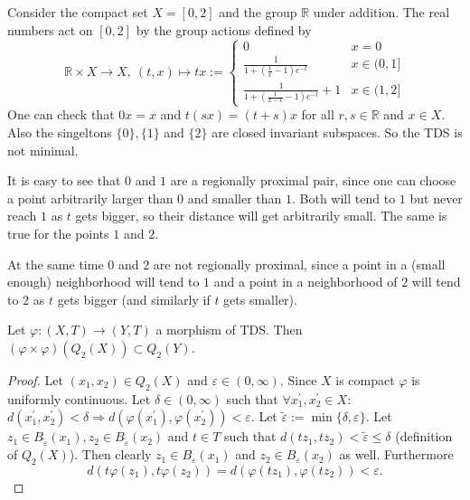 \begin{example}
  Consider the compact set $X = [0, 2]$ and the group $\mathbb{R}$ under addition.
  The real numbers act on $[0, 2]$ by the group actions defined by
  \begin{equation*}
    \mathbb{R} \times X \to X, \ (t, x) \mapsto 
    tx := \begin{cases}
      0 & x = 0 \\
      \frac{1}{1 + (\frac{1}{x} - 1)e^{-t}} & x \in (0, 1] \\
      \frac{1}{1 + (\frac{1}{x - 1} - 1)e^{-t}} + 1 & x \in (1, 2]
    \end{cases}
  \end{equation*}
  One can check that $0x = x$ and $t(sx) = (t + s)x$ for all $r, s \in \mathbb{R}$ and $x \in X$.
  Also the singeltons $\{ 0 \}, \{ 1 \}$ and $\{ 2 \}$ are closed invariant subspaces.
  So the TDS is not minimal.

  It is easy to see that $0$ and $1$ are a regionally proximal pair,
  since one can choose a point arbitrarily larger than $0$ and smaller than $1$.
  Both will tend to $1$ but never reach $1$ as $t$ gets bigger,
  so their distance will get arbitrarily small.
  The same is true for the points $1$ and $2$.

  At the same time $0$ and $2$ are not regionally proximal,
  since a point in a (small enough) neighborhood will tend to $1$ and a point in a neighborhood of $2$ will tend to $2$ as $t$ gets bigger
  (and similarly if $t$ gets smaller).
\end{example}
\begin{proposition}
  \label{prop:phiSqQ2XcQ2Y}
  Let $\varphi : (X,T) \to (Y,T)$ a morphism of TDS. Then $(\varphi \times \varphi) (Q_2 (X)) \subset Q_2(Y)$.
\end{proposition}
\begin{proof}
  Let $(x_1, x_2) \in Q_2(X)$ and $\varepsilon \in (0,\infty)$.
  Since $X$ is compact $\varphi$ is uniformly continuous.
  Let $\delta \in (0, \infty)$ such that $\forall x_1^\prime, x_2^\prime \in X:$ $d(x_1^\prime, x_2^\prime)<\delta \Rightarrow d(\varphi (x_1^\prime), \varphi(x_2^\prime)) < \varepsilon$.
  Let $\tilde{\varepsilon} := \min \{\delta, \varepsilon\}$.
  Let $z_1 \in B_{\tilde{\varepsilon}} (x_1), z_2 \in  B_{\tilde{\varepsilon}}(x_2)$ and $t \in T$ such that $d(t z_1, tz_2) < \tilde{\varepsilon} \leq \delta$ (definition of $Q_2(X)$).
  Then clearly $z_1 \in B_\varepsilon (x_1)$ and $z_2 \in B_\varepsilon  (x_2)$ as well.
  Furthermore
  \begin{equation*}
    d(t \varphi (z_1), t\varphi(z_2)) = d (\varphi ( t z_1) , \varphi (t z_2)) < \varepsilon.
  \end{equation*}
\end{proof}

